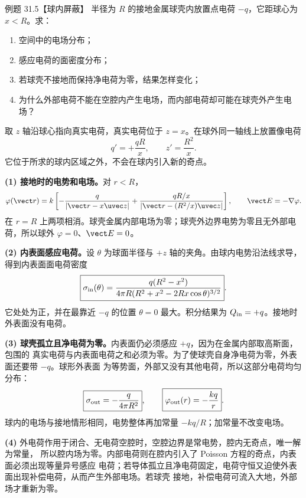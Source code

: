 \Needspace{0.42\textheight}
\begin{origexamplebox}{例题 31.5【球内屏蔽】}
半径为 $R$ 的接地金属球壳内放置点电荷 $-q$，它距球心为 $x<R$。求：
\begin{enumerate}[label=(\arabic*),leftmargin=2.2em]
  \item 空间中的电场分布；
  \item 感应电荷的面密度分布；
  \item 若球壳不接地而保持净电荷为零，结果怎样变化；
  \item 为什么外部电荷不能在空腔内产生电场，而内部电荷却可能在球壳外产生电场？
\end{enumerate}
\end{origexamplebox}

\begin{xesolution}
取 $z$ 轴沿球心指向真实电荷，真实电荷位于 $z=x$。在球外同一轴线上放置像电荷
\[
  q'=+\frac{qR}{x},\qquad z'=\frac{R^2}{x}.
\]
它位于所求的球内区域之外，不会在球内引入新的奇点。

\textbf{(1) 接地时的电势和电场。}对 $r<R$，
\begin{equation}
  \varphi(\vect r)=k\left[
  -\frac q{|\vect r-x\uvec z|}
  +\frac{qR/x}{|\vect r-(R^2/x)\uvec z|}\right],
  \qquad \vect E=-\nabla\varphi.
\end{equation}
在 $r=R$ 上两项相消。球壳金属内部电场为零；球壳外边界电势为零且无外部电荷，所以球外
$\varphi=0$、$\vect E=0$。

\textbf{(2) 内表面感应电荷。}设 $\theta$ 为球面半径与 $+z$ 轴的夹角。由球内电势沿法线求导，
得到内表面面电荷密度
\begin{equation}
  \boxed{\sigma_{\rm in}(\theta)=
  \frac{q(R^2-x^2)}{4\pi R
  (R^2+x^2-2Rx\cos\theta)^{3/2}}}.
\end{equation}
它处处为正，并在最靠近 $-q$ 的位置 $\theta=0$ 最大。积分结果为
$Q_{\rm in}=+q$。接地时外表面没有电荷。

\textbf{(3) 球壳孤立且净电荷为零。}内表面仍必须感应 $+q$，因为在金属内部取高斯面，包围的
真实电荷与内表面电荷之和必须为零。为了使球壳自身净电荷为零，外表面还要带 $-q$。球形外表面
为等势面，外部又没有其他电荷，所以这部分电荷均匀分布：
\[
  \boxed{\sigma_{\rm out}=-\frac{q}{4\pi R^2}},
  \qquad
  \boxed{\varphi_{\rm out}(r)=-\frac{kq}{r}}.
\]
球内的电场与接地情形相同，电势整体再加常量 $-kq/R$；加常量不改变电场。

\textbf{(4)} 外电荷作用于闭合、无电荷空腔时，空腔边界是常电势，腔内无奇点，唯一解为常量，
所以腔内场为零。内部电荷则在腔内引入了 Poisson 方程的奇点，内表面必须出现等量异号感应
电荷；若导体孤立且净电荷固定，电荷守恒又迫使外表面出现补偿电荷，从而产生外部电场。若球壳
接地，补偿电荷可流入大地，外部场才重新为零。

\innerSphereDiagram
\end{xesolution}

